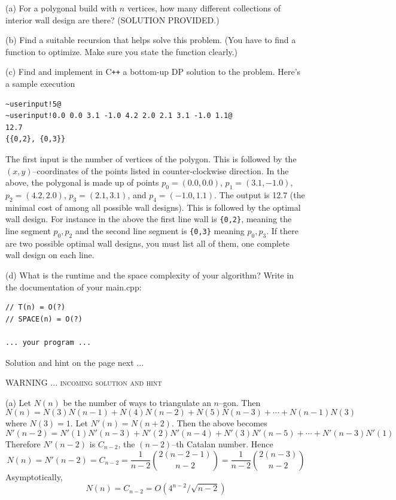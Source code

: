 (a) For a polygonal build with $n$ vertices,
how many different collections of interior wall design are there?
(SOLUTION PROVIDED.)

(b)
Find a suitable recursion that helps solve this problem.
(You have to find a function to optimize. Make sure you state the function clearly.)

(c)
Find and implement in C\texttt{++} a bottom-up DP solution to the problem.
Here's a sample execution
\begin{Verbatim}[frame=single,commandchars=\~\!\@]
~userinput!5@
~userinput!0.0 0.0 3.1 -1.0 4.2 2.0 2.1 3.1 -1.0 1.1@
12.7
{{0,2}, {0,3}}
\end{Verbatim}
The first input is the number of vertices of the polygon.
This is followed by the $(x,y)$--coordinates of the points listed in
counter-clockwise direction.
In the above, the polygonal is made up of points
$p_0 = (0.0, 0.0)$,
$p_1 = (3.1, -1.0)$,
$p_2 = (4.2, 2.0)$,
$p_3 = (2.1, 3.1)$, and
$p_4 = (-1.0, 1.1)$.
The output is 12.7 (the minimal cost of among all possible wall designs).
This is followed by the optimal wall design.
For instance in the above the first line wall is
\verb!{0,2}!, meaning the line segment $p_0, p_2$
and the second line segment is \verb!{0,3}! meaning $p_0, p_3$.
If there are two possible optimal wall designs, you must list all of them,
one complete wall design on each line.

(d) What is the runtime and the space complexity of your algorithm?
Write in the documentation of your main.cpp:
\begin{Verbatim}[frame=single,fontsize=\small]
// T(n) = O(?)
// SPACE(n) = O(?)

... your program ...
\end{Verbatim}

Solution and hint on the page next ...

\newpage
\textsc{WARNING ... incoming solution and hint}

(a)
Let $N(n)$ be the number of ways to triangulate an $n$--gon. Then
\[
N(n) = N(3)N(n-1) + N(4)N(n-2) + N(5)N(n-3) + \cdots + N(n-1)N(3)
\]
where $N(3) = 1$.
Let $N'(n) = N(n + 2)$.
Then the above becomes
\[
N'(n - 2) = N'(1)N'(n-3) + N'(2)N'(n-4) + N'(3)N'(n-5) + \cdots + N'(n-3)N'(1)
\]
Therefore
$N'(n - 2)$ is $C_{n-2}$, the $(n-2)$--th Catalan number.
Hence
\[
  N(n)
  =
  N'(n-2)
  = C_{n - 2}
  = \frac{1}{n - 2} \binom{2(n - 2 - 1)}{n - 2}
  = \frac{1}{n - 2} \binom{2(n - 3)}{n - 2}
\]
Asymptotically,
\[
  N(n)
  = C_{n - 2}
  = O(4^{n-2}/\sqrt{n-2})
\]


